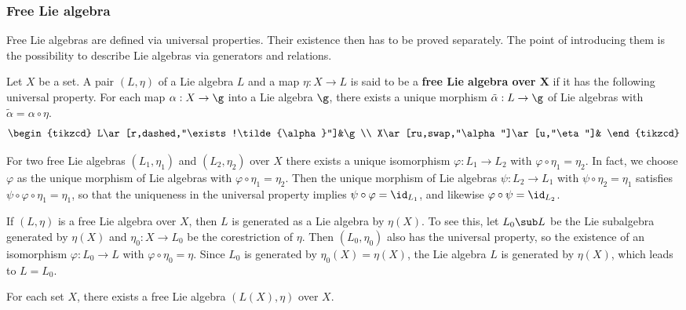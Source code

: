 \subsubsection{Free Lie algebra}
Free Lie algebras are defined via universal properties. Their existence then has to be proved separately. The point of introducing them is the possibility to describe Lie algebras via generators and relations.
\begin{definition}
Let $X$ be a set. A pair $(L,\eta)$ of a Lie algebra $L$ and a map $\eta:X\to L$ is said to be a \textbf{free Lie algebra over $\bm{X}$} if it has the following universal property. For each map $\alpha:X\to\g$ into a Lie algebra $\g$, there exists a unique morphism $\tilde{\alpha}:L\to\g$ of Lie algebras with $\tilde{\alpha}=\alpha\circ\eta$.
\[\begin{tikzcd}
L\ar[r,dashed,"\exists!\tilde{\alpha}"]&\g\\
X\ar[ru,swap,"\alpha"]\ar[u,"\eta"]&
\end{tikzcd}\]
\end{definition}
For two free Lie algebras $(L_1,\eta_1)$ and $(L_2,\eta_2)$ over $X$ there exists a unique isomorphism $\varphi:L_1\to L_2$ with $\varphi\circ\eta_1=\eta_2$. In fact, we choose $\varphi$ as the unique morphism of Lie algebras with $\varphi\circ\eta_1=\eta_2$. Then the unique morphism of Lie algebras $\psi:L_2\to L_1$ with $\psi\circ\eta_2=\eta_1$ satisfies $\psi\circ\varphi\circ\eta_1=\eta_1$, so that the uniqueness in the universal property implies $\psi\circ\varphi=\id_{L_1}$, and likewise $\varphi\circ\psi=\id_{L_2}$.
\begin{remark}
If $(L,\eta)$ is a free Lie algebra over $X$, then $L$ is generated as a Lie algebra by $\eta(X)$. To see this, let $L_0\sub L$ be the Lie subalgebra generated by $\eta(X)$ and $\eta_0:X\to L_0$ be the corestriction of $\eta$. Then $(L_0,\eta_0)$ also has the universal property, so the existence of an isomorphism $\varphi:L_0\to L$ with $\varphi\circ\eta_0=\eta$. Since $L_0$ is generated by $\eta_0(X)=\eta(X)$, the Lie algebra $L$ is generated by $\eta(X)$, which leads to $L=L_0$.
\end{remark}
\begin{proposition}
For each set $X$, there exists a free Lie algebra $(L(X),\eta)$ over $X$.
\end{proposition}
